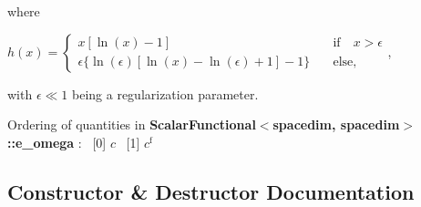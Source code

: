 where

$ h(x) = \begin{cases} x [ \ln(x)-1] \quad&\mathrm{if}\quad x>\epsilon\\ \epsilon \{ \ln(\epsilon) [ \ln(x) - \ln(\epsilon) + 1] - 1\} \quad&\mathrm{else}, \end{cases} $,

with $\epsilon \ll 1$ being a regularization parameter.

Ordering of quantities in {\bf Scalar\+Functional$<$spacedim, spacedim$>$\+::e\+\_\+omega} \+:~\newline
 \mbox{[}0\mbox{]} $c$~\newline
 \mbox{[}1\mbox{]} $c^\mathrm{f}$ 

\subsection{Constructor \& Destructor Documentation}
